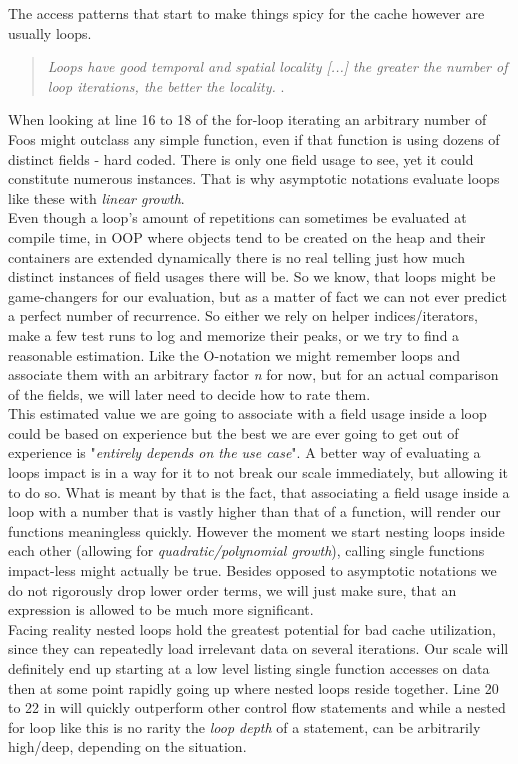 The access patterns that start to make things spicy for the cache however are usually loops.
\begin{quote}
	\textit{Loops have good temporal and spatial locality [...] the greater the number of loop iterations, the better the locality.} .
\end{quote}
When looking at line 16 to 18 of  the for-loop iterating an arbitrary number of Foos might outclass any simple function, even if that function is using dozens of distinct fields - hard coded. There is only one field usage to see, yet it could constitute numerous instances. That is why asymptotic notations evaluate loops like these with \textit{linear growth}.\\
Even though a loop's amount of repetitions can sometimes be evaluated at compile time, in OOP where objects tend to be created on the heap and their containers are extended dynamically there is no real telling just how much distinct instances of field usages there will be. So we know, that loops might be game-changers for our evaluation, but as a matter of fact we can not ever predict a perfect number of recurrence. So either we rely on helper indices/iterators, make a few test runs to log and memorize their peaks, or we try to find a reasonable estimation. Like the O-notation we might remember loops and associate them with an arbitrary factor \textit{n} for now, but for an actual comparison of the fields, we will later need to decide how to rate them.\\
This estimated value we are going to associate with a field usage inside a loop could be based on experience but the best we are ever going to get out of experience is "\textit{entirely depends on the use case}". A better way of evaluating a loops impact is in a way for it to not break our scale immediately, but allowing it to do so. What is meant by that is the fact, that associating a field usage inside a loop with a number that is vastly higher than that of a function, will render our functions meaningless quickly. However the moment we start nesting loops inside each other (allowing for \textit{quadratic/polynomial growth}), calling single functions impact-less might actually be true. Besides opposed to asymptotic notations we do not rigorously drop lower order terms, we will just make sure, that an expression is allowed to be much more significant.\\
Facing reality nested loops hold the greatest potential for bad cache utilization, since they can repeatedly load irrelevant data on several iterations. Our scale will definitely end up starting at a low level listing single function accesses on data then at some point rapidly going up where nested loops reside together. Line 20 to 22 in  will quickly outperform other control flow statements and while a nested for loop like this is no rarity the \textit{loop depth} of a statement, can be arbitrarily high/deep, depending on the situation.\\
